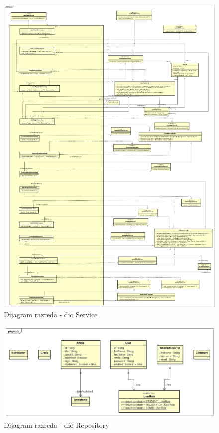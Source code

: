 			\eject

			\begin{figure}[H]
				\includegraphics[scale=0.5]{slike/DijagramRazreda3.jpg}
				\centering
				\caption{Dijagram razreda - dio Service}
				\label{fig:class_diagram_service}
			\end{figure}

			\eject

			\begin{figure}[H]
				\includegraphics[scale=0.4]{slike/DijagramRazreda4.jpg}
				\centering
				\caption{Dijagram razreda - dio Repository}
				\label{fig:class_diagram_repository}
			\end{figure}

